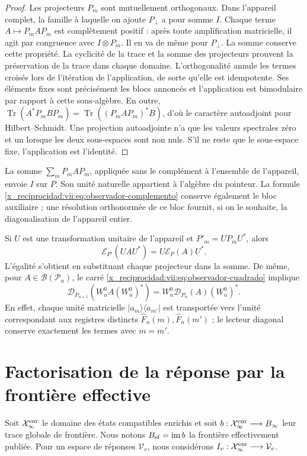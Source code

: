 \begin{proof}
Les projecteurs \(P_m\) sont mutuellement orthogonaux. Dans l'appareil complet, la famille à laquelle on ajoute \(P_\perp\) a pour somme \(I\). Chaque terme \(A\mapsto P_mAP_m\) est complètement positif : après toute amplification matricielle, il agit par congruence avec \(I\otimes P_m\). Il en va de même pour \(P_\perp\). La somme conserve cette propriété. La cyclicité de la trace et la somme des projecteurs prouvent la préservation de la trace dans chaque domaine. L'orthogonalité annule les termes croisés lors de l'itération de l'application, de sorte qu'elle est idempotente. Ses éléments fixes sont précisément les blocs annoncés et l'application est bimodulaire par rapport à cette sous-algèbre. En outre, \(\operatorname{Tr}(A^*P_mBP_m)
 =\operatorname{Tr}((P_mAP_m)^*B)\), d'où le caractère autoadjoint pour Hilbert--Schmidt. Une projection autoadjointe n'a que les valeurs spectrales zéro et un lorsque les deux sous-espaces sont non nuls. S'il ne reste que le sous-espace fixe, l'application est l'identité.
\end{proof}

La somme \(\sum_mP_mAP_m\), appliquée sans le complément à l'ensemble de
l'appareil, envoie \(I\) sur \(P\). Son unité naturelle appartient à l'algèbre
du pointeur. La formule \eqref{x_reciprocidad:vii:eq:observador-complemento} conserve
également le bloc auxiliaire ; une résolution orthonormée de ce bloc
fournit, si on le souhaite, la diagonalisation de l'appareil entier.

Si \(U\) est une transformation unitaire de l'appareil et
\(P'_m=UP_mU^*\), alors
\[
 \mathcal E_{P'}(UAU^*)=U\mathcal E_P(A)U^*.
\]
L'égalité s'obtient en substituant chaque projecteur dans la somme.
De même, pour \(A\in\mathcal B(\mathcal P_n)\), le carré
\eqref{x_reciprocidad:vii:eq:observador-cuadrado} implique
\[
 \mathcal D_{P_{n+1}}(W_n^0A(W_n^0)^*)
 =W_n^0\mathcal D_{P_n}(A)(W_n^0)^*.
\]
En effet, chaque unité matricielle \(|a_m\rangle\langle a_{m'}|\)
est transportée vers l'unité correspondant aux registres distincts
\(\widehat F_n(m),\widehat F_n(m')\) ; le lecteur diagonal conserve
exactement les termes avec \(m=m'\).

\section{Factorisation de la réponse par la frontière effective}
\label{x_reciprocidad:vii:sec:observador-factorizacion}

Soit \(\mathcal X_\infty^{\rm enr}\) le domaine des états compatibles
enrichis et soit
\(b:\mathcal X_\infty^{\rm enr}\longrightarrow B_\infty\) leur trace
globale de frontière. Nous notons \(B_{\rm ef}=\operatorname{im}b\)
la frontière effectivement publiée. Pour un espace de réponses
\(\mathcal V_v\), nous considérons
\(I_v:\mathcal X_\infty^{\rm enr}\longrightarrow\mathcal V_v\).

